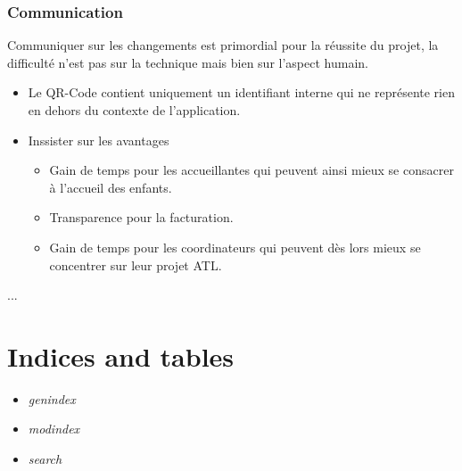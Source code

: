 \documentclass[letterpaper,10pt,english]{sphinxmanual}
\begin{document}
\subsection{Communication}
\label{checklist:communication}
Communiquer sur les changements est primordial pour la réussite du projet, la difficulté n'est pas sur la technique mais bien sur l'aspect humain.
\begin{itemize}
\item {} 
Le QR-Code contient uniquement un identifiant interne qui ne représente rien en dehors du contexte de l'application.

\item {} 
Inssister sur les avantages
\begin{itemize}
\item {} 
Gain de temps pour les accueillantes qui peuvent ainsi mieux se consacrer à l'accueil des enfants.

\item {} 
Transparence pour la facturation.

\item {} 
Gain de temps pour les coordinateurs qui peuvent dès lors mieux se concentrer sur leur projet ATL.

\end{itemize}

\end{itemize}

...


\chapter{Indices and tables}
\label{index:indices-and-tables}\begin{itemize}
\item {} 
\emph{genindex}

\item {} 
\emph{modindex}

\item {} 
\emph{search}

\end{itemize}



\renewcommand{\indexname}{Index}
\printindex
\end{document}
